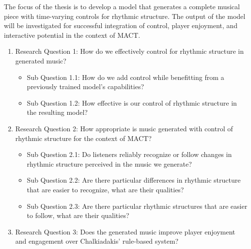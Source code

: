 The focus of the thesis is to develop a model that generates a complete musical piece with time-varying controls for rhythmic structure. The output of the model will be investigated for successful integration of control, player enjoyment, and interactive potential in the context of MACT. 
  
\begin{enumerate}
\item{Research Question 1}: How do we effectively control for rhythmic structure in generated music?
\begin{itemize}
\item{Sub Question 1.1}: How do we add control while benefitting from a previously trained model's capabilities?
\item{Sub Question 1.2}: How effective is our control of rhythmic structure in the resulting model?
\end{itemize}
\item{Research Question 2}: How appropriate is music generated with control of rhythmic structure for the context of MACT?
\begin{itemize}
\item{Sub Question 2.1}: Do listeners reliably recognize or follow changes in rhythmic structure perceived in the music we generate?
\item{Sub Question 2.2}: Are there particular differences in rhythmic structure that are easier to recognize, what are their qualities?
\item{Sub Question 2.3}: Are there particular rhythmic structures that are easier to follow, what are their qualities? 
\end{itemize}
\item {Research Question 3}: Does the generated music improve player enjoyment and engagement over Chalkiadakis' \cite{Chalkiadakis_2022} rule-based system? 
\end{enumerate}
